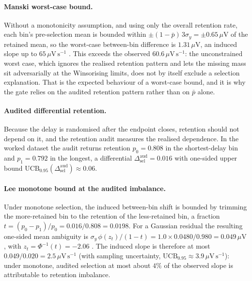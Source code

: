 \documentclass[11pt,a4paper]{article}
\theoremstyle{definition}
\newcommand{\UCB}{\mathrm{UCB}_{0.95}}
\begin{document}
\paragraph{Manski worst-case bound.} Without a monotonicity assumption, and using
only the overall retention rate, each bin's pre-selection mean is bounded within
\(\pm(1-\bar p)\,3\sigma_y=\pm0.65\,\mu\mathrm{V}\) of the retained mean, so the
worst-case between-bin difference is \(1.31\,\mu\mathrm{V}\), an induced slope up
to \(65\,\mu\mathrm{V\,s^{-1}}\) \citep{Manski1990}. This exceeds the observed
\(60.6\,\mu\mathrm{V\,s^{-1}}\): the unconstrained worst case, which ignores the
realised retention pattern and lets the missing mass sit adversarially at the
Winsorising limits, does not by itself exclude a selection explanation.
That is the expected behaviour of a worst-case bound, and it is why the gate
relies on the audited retention pattern rather than on \(\bar p\) alone.

\paragraph{Audited differential retention.} Because the delay is randomised after
the endpoint closes, retention should not depend on it, and the retention audit
measures the realised dependence. In the worked dataset the audit returns
retention \(p_0=0.808\) in the shortest-delay bin and \(p_1=0.792\) in the
longest, a differential \(\Delta_{\mathrm{sel}}^{\mathrm{aud}}=0.016\) with
one-sided upper bound
\(\UCB(\Delta_{\mathrm{sel}}^{\mathrm{aud}})\approx0.06\).

\paragraph{Lee monotone bound at the audited imbalance.} Under monotone
selection, the induced between-bin shift is bounded by trimming the more-retained
bin to the retention of the less-retained bin, a fraction
\(t=(p_0-p_1)/p_0=0.016/0.808=0.0198\). For a Gaussian residual the resulting
one-sided mean ambiguity is
\(\sigma_y\,\phi(z_t)/(1-t)=1.0\times0.0480/0.980=0.049\,\mu\mathrm{V}\), with
\(z_t=\Phi^{-1}(t)=-2.06\) \citep{Lee2009}. The induced slope is therefore at most
\(0.049/0.020=2.5\,\mu\mathrm{V\,s^{-1}}\) (with sampling uncertainty,
\(\UCB\approx3.9\,\mu\mathrm{V\,s^{-1}}\)): under monotone, audited selection at
most about \(4\%\) of the observed slope is attributable to retention imbalance.
\end{document}
